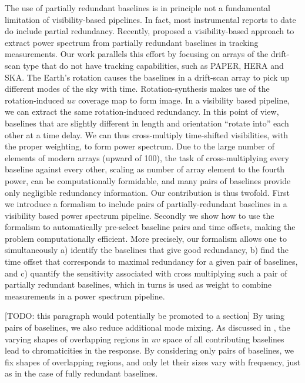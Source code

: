 \documentclass[twocolumn,apj,numberedappendix]{emulateapj}
\renewcommand\[{\begin{equation}}
\renewcommand\]{\end{equation}}
\begin{document}
The use of partially redundant baselines is in principle not a fundamental limitation of visibility-based pipelines. In fact, most instrumental reports to date do include partial redundancy. Recently, \cite{wterm} proposed a visibility-based approach to extract power spectrum from partially redundant baselines in tracking measurements. Our work parallels this effort by focusing on arrays of the drift-scan type that do not have tracking capabilities, such as PAPER, HERA and SKA.
The Earth's rotation causes the baselines in a drift-scan array to pick up different modes of the sky with time. Rotation-synthesis makes use of the rotation-induced $uv$ coverage map to form image. In a visibility based pipeline, we can extract the same rotation-induced redundancy. In this point of view, baselines that are slightly different in length and orientation
``rotate into'' each other at a time delay. We can thus cross-multiply time-shifted visibilities, with the proper weighting, to form power spectrum.  Due to the large number of elements of modern arrays (upward of 100), the task of cross-multiplying every baseline against every other, scaling as number of array element to the fourth power, can be computationally formidable, and many pairs of baselines provide only negligible redundancy information. Our contribution is thus twofold. First we introduce a formalism to include pairs of partially-redundant baselines in a visibility based power spectrum pipeline. Secondly we show how to use the formalism to automatically pre-select baseline pairs and time offsets, making the problem computationally efficient. More precisely, our formalism allows one to simultaneously a) identify the baselines that give good
redundancy, b) find the time offset that corresponds to maximal redundancy for a given pair of baselines, and
c) quantify the sensitivity associated with cross multiplying
such a pair of partially redundant baselines, which in turns is used as weight to combine measurements in a power spectrum pipeline. 

[TODO: this paragraph would potentially be promoted to a section] By using pairs of baselines, we also reduce additional mode mixing. As discussed in \cite{Hazelton2013}, the varying shapes of overlapping regions in $uv$ space of all contributing baselines lead to chromaticities in the response. By considering only pairs of baselines, we fix shapes of overlapping regions, and only let their sizes vary with frequency, just as in the case of fully redundant baselines.  
\end{document}
